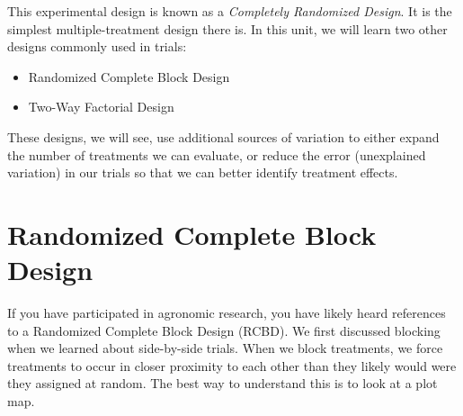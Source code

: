 \documentclass[
]{book}
\providecommand{\tightlist}{%
  \setlength{\itemsep}{0pt}\setlength{\parskip}{0pt}}
\begin{document}
This experimental design is known as a \emph{Completely Randomized Design}. It is the simplest multiple-treatment design there is. In this unit, we will learn two other designs commonly used in trials:

\begin{itemize}
\tightlist
\item
  Randomized Complete Block Design
\item
  Two-Way Factorial Design
\end{itemize}

These designs, we will see, use additional sources of variation to either expand the number of treatments we can evaluate, or reduce the error (unexplained variation) in our trials so that we can better identify treatment effects.

\hypertarget{randomized-complete-block-design}{%
\section{Randomized Complete Block Design}\label{randomized-complete-block-design}}

If you have participated in agronomic research, you have likely heard references to a Randomized Complete Block Design (RCBD). We first discussed blocking when we learned about side-by-side trials. When we block treatments, we force treatments to occur in closer proximity to each other than they likely would were they assigned at random. The best way to understand this is to look at a plot map.
\end{document}
